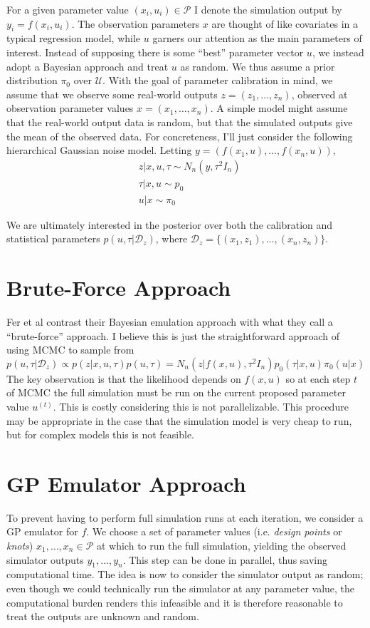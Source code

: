 \documentclass[12pt]{article}
\begin{document}
For a given parameter value $(x_i, u_i) \in \mathcal{P}$ I denote the simulation output by $y_i = f(x_i, u_i)$.
The observation parameters $x$ are thought of like covariates in a typical regression model, while $u$ garners our attention as the main parameters of interest. Instead of supposing 
there is some ``best'' parameter vector $u$, we instead adopt a Bayesian approach and treat $u$ as random. 
 We thus assume a prior distribution $\pi_0$ over $\mathcal{U}$. 
With the goal of parameter calibration in mind, we assume that we observe some real-world outputs $z = (z_1, \dots, z_n)$, observed at observation parameter values 
$x = (x_1, \dots, x_n)$. A simple model might assume that the real-world output data is random, but that the simulated outputs give the mean of the observed data. 
For concreteness, I'll just consider the following hierarchical Gaussian noise model. Letting $y = (f(x_1, u), \dots, f(x_n, u))$,
\begin{align*}
&z|x, u, \tau \sim N_n(y, \tau^2 I_n) \\
&\tau|x, u \sim p_0 \\
&u|x \sim \pi_0
\end{align*}

We are ultimately interested in the posterior over both the calibration and statistical parameters $p(u, \tau|\mathcal{D}_z)$, where $\mathcal{D}_z = \{(x_1, z_1), \dots, (x_n, z_n)\}$.  

\section{Brute-Force Approach}
Fer et al contrast their Bayesian emulation approach with what they call a ``brute-force'' approach. I believe this is just the straightforward approach of using MCMC to sample from 
\[p(u, \tau|\mathcal{D}_z) \propto p(z|x, u, \tau)p(u, \tau) = N_n(z|f(x, u), \tau^2 I_n)p_0(\tau|x, u)\pi_0(u|x)\] 
The key observation is that the likelihood depends on $f(x, u)$ so at each step $t$ of MCMC the full simulation must be run on the current proposed parameter value $u^{(t)}$. This is costly considering this is not parallelizable. This procedure may be appropriate in the case that the simulation model is very cheap to run, but for complex models this is not 
feasible. 

\section{GP Emulator Approach}
To prevent having to perform full simulation runs at each iteration, we consider a GP emulator for $f$. We choose a set of parameter values (i.e. \textit{design points} or \textit{knots}) $x_1, \dots, x_n \in \mathcal{P}$ at which to run the full simulation, yielding the observed simulator outputs $y_1, \dots, y_n$. This step can be done in parallel, 
thus saving computational time. The idea is now to consider the simulator output as random; even though we could technically run the simulator at any parameter value, the 
computational burden renders this infeasible and it is therefore reasonable to treat the outputs are unknown and random. 
\end{document}
